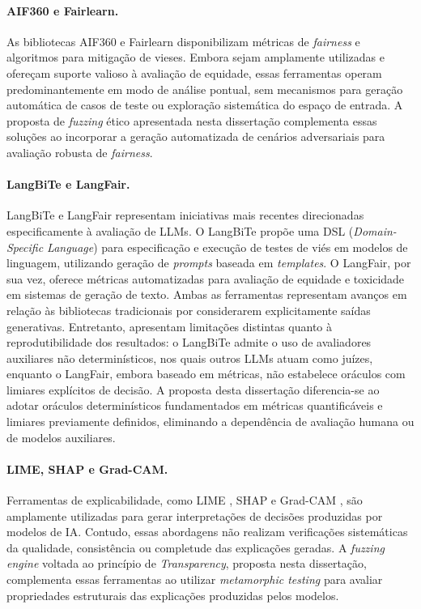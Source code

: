 \paragraph{\textbf{AIF360 e Fairlearn.}}

As bibliotecas AIF360 \cite{Bellamy2019} e Fairlearn \cite{Bird2020} disponibilizam métricas de \textit{fairness} e algoritmos para mitigação de vieses. Embora sejam amplamente utilizadas e ofereçam suporte valioso à avaliação de equidade, essas ferramentas operam predominantemente em modo de análise pontual, sem mecanismos para geração automática de casos de teste ou exploração sistemática do espaço de entrada. A proposta de \textit{fuzzing} ético apresentada nesta dissertação complementa essas soluções ao incorporar a geração automatizada de cenários adversariais para avaliação robusta de \textit{fairness}.

\paragraph{\textbf{LangBiTe e LangFair.}}

LangBiTe \cite{Morales2025} e LangFair \cite{Bouchard2025} representam iniciativas mais recentes direcionadas especificamente à avaliação de LLMs. O LangBiTe propõe uma DSL (\textit{Domain-Specific Language}) para especificação e execução de testes de viés em modelos de linguagem, utilizando geração de \textit{prompts} baseada em \textit{templates}. O LangFair, por sua vez, oferece métricas automatizadas para avaliação de equidade e toxicidade em sistemas de geração de texto. Ambas as ferramentas representam avanços em relação às bibliotecas tradicionais por considerarem explicitamente saídas generativas. Entretanto, apresentam limitações distintas quanto à reprodutibilidade dos resultados: o LangBiTe admite o uso de avaliadores auxiliares não determinísticos, nos quais outros LLMs atuam como juízes, enquanto o LangFair, embora baseado em métricas, não estabelece oráculos com limiares explícitos de decisão. A proposta desta dissertação diferencia-se ao adotar oráculos determinísticos fundamentados em métricas quantificáveis e limiares previamente definidos, eliminando a dependência de avaliação humana ou de modelos auxiliares.

\paragraph{\textbf{LIME, SHAP e Grad-CAM.}}

Ferramentas de explicabilidade, como LIME \cite{Ribeiro2016}, SHAP \cite{Lundberg2017} e Grad-CAM \cite{Selvaraju2020}, são amplamente utilizadas para gerar interpretações de decisões produzidas por modelos de IA. Contudo, essas abordagens não realizam verificações sistemáticas da qualidade, consistência ou completude das explicações geradas. A \textit{fuzzing engine} voltada ao princípio de \textit{Transparency}, proposta nesta dissertação, complementa essas ferramentas ao utilizar \textit{metamorphic testing} para avaliar propriedades estruturais das explicações produzidas pelos modelos.

